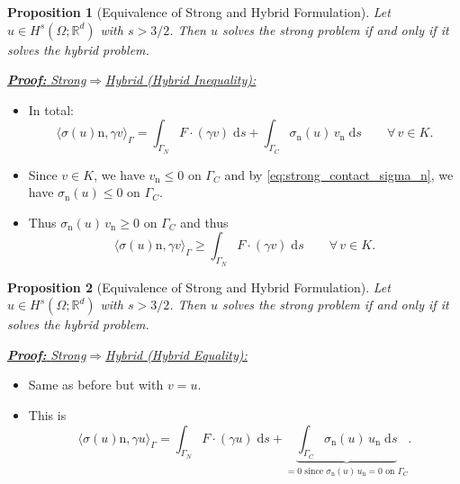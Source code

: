 \documentclass[10pt,aspectratio=169]{beamer}
\newtheorem{proposition}{Proposition}[section]
\def\R{{\mathbb R}}
\def\d{{\mathrm{d}}}
\def\ds{{\d s}}
\begin{document}
\begin{frame}
	\begin{proposition}[Equivalence of Strong and Hybrid Formulation]
		Let $u\in H^s(\Omega;\R^d)$ with $s>3/2$. Then $u$ solves the strong problem if and only if it solves the hybrid problem.
	\end{proposition}
	\underline{\textbf{\em Proof:} {\em Strong\enspace}$\Longrightarrow${\em\enspace Hybrid (Hybrid Inequality):}}
	\begin{itemize}
		\item In total:
		      \begin{equation*}
			      \langle \sigma(u)\mathrm n,\gamma v\rangle_\Gamma
			      = \int_{\Gamma_N}F\cdot(\gamma v)\;\ds + \int_{\Gamma_C} \sigma_\mathrm{n}(u)\, v_\mathrm{n}\;\ds\qquad \forall\, v\in K.
		      \end{equation*}
		\item Since $v\in K$, we have $v_\mathrm{n}\le 0$ on $\Gamma_C$ and by \eqref{eq:strong_contact_sigma_n}, we have $\sigma_\mathrm{n}(u)\le 0$ on $\Gamma_C$.
		\item Thus $\sigma_\mathrm{n}(u)\, v_\mathrm{n}\ge 0$ on $\Gamma_C$ and thus
		      \begin{equation*}
			      \langle \sigma(u)\mathrm n,\gamma v\rangle_\Gamma
			      \ge \int_{\Gamma_N}F\cdot(\gamma v)\;\ds\qquad \forall\, v\in K.
		      \end{equation*}
	\end{itemize}
\end{frame}

\begin{frame}
	\begin{proposition}[Equivalence of Strong and Hybrid Formulation]
		Let $u\in H^s(\Omega;\R^d)$ with $s>3/2$. Then $u$ solves the strong problem if and only if it solves the hybrid problem.
	\end{proposition}
	\underline{\textbf{\em Proof:} {\em Strong\enspace}$\Longrightarrow${\em\enspace Hybrid (Hybrid Equality):}}
	\begin{itemize}
		\item Same as before but with $v = u$.
		\item This is
		      \begin{equation*}
			      \langle \sigma(u)\mathrm n,\gamma u\rangle_\Gamma
			      = \int_{\Gamma_N}F\cdot(\gamma u)\;\ds + \underbrace{\int_{\Gamma_C} \sigma_\mathrm{n}(u)\, u_\mathrm{n}\;\ds}_{=0\text{ since }\sigma_\mathrm{n}(u)\, u_\mathrm{n}=0\text{ on }\Gamma_C}.
		      \end{equation*}
	\end{itemize}
\end{frame}
\end{document}
